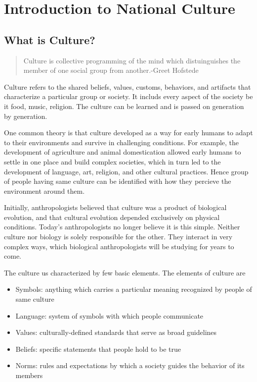 \documentclass{article}
\begin{document}
\newpage
\tableofcontents
\newpage
\listoffigures
\newpage
\listoftables

\newpage
\section{Introduction to National Culture}
\subsection{What is Culture?}
\begin{quote}
    Culture is collective programming of the mind which distuinguishes the member of one social group from another.\hfill -Greet Hofstede
\end{quote}

Culture refers to the shared beliefs, values, customs, behaviors, and artifacts that characterize a particular group or society. It includs every aspect of the society be it food, music, religion. The culture can be learned and is passed on generation by generation.

One common theory is that culture developed as a way for early humans to adapt to their environments and survive in challenging conditions. For example, the development of agriculture and animal domestication allowed early humans to settle in one place and build complex societies, which in turn led to the development of language, art, religion, and other cultural practices. Hence group of people having same culture can be identified with how they percieve the environment around them.

Initially, anthropologists believed that culture was a product of biological evolution, and that cultural evolution depended exclusively on physical conditions. Today’s anthropologists no longer believe it is this simple. Neither culture nor biology is solely responsible for the other. They interact in very complex ways, which biological anthropologists will be studying for years to come.

The culture us characterized by few basic elements. The elements of culture are
\begin{itemize}
    \item Symbols: anything which carries a particular meaning recognized by people of same culture
    \item Language: system of symbols with which people communicate
    \item Values: culturally-defined standards that serve as broad guidelines
    \item Beliefs: specific statements that people hold to be true
    \item Norms: rules and expectations by which a society guides the behavior of its members
\end{itemize}
\end{document}
